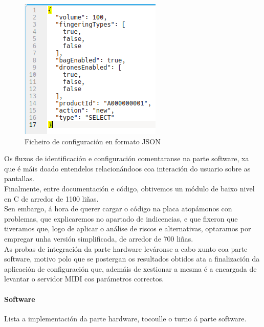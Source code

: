    \begin{figure}[htbp]
    \centering
    \includegraphics[scale=0.6, keepaspectratio=true]{./imagenes/ficheiro-json.png}
    \caption{Ficheiro de configuración en formato JSON}
    \label{figura:FicheiroJson}
   \end{figure}
   
   Os fluxos de identificación e configuración comentaranse na parte software,
   xa que é máis doado entendelos relacionándoos coa interación do usuario sobre
   as pantallas. \\
   
   Finalmente, entre documentación e código, obtivemos un módulo de baixo nivel
   en C de arredor de 1100 liñas. \\
   
   Sen embargo, á hora de querer cargar o código na placa atopámonos con
   problemas, que explicaremos no apartado de indicencias, e que fixeron que
   tiveramos que, logo de aplicar o análise de riscos e alternativas, optaramos
   por empregar unha versión simplificada, de arredor de 700 liñas. \\
   
   As probas de integración da parte hardware leváronse a cabo xunto coa parte
   software, motivo polo que se postergan os resultados obtidos ata a
   finalización da aplicación de configuración que, ademáis de xestionar a mesma
   é a encargada de levantar o servidor MIDI cos parámetros correctos.
   
   \paragraph{Software}
   
   Lista a implementación da parte hardware, tocoulle o turno á parte
   software. \\
   
